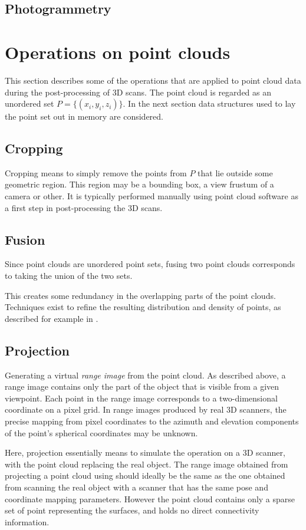 \subsection{Photogrammetry}


\section{Operations on point clouds}
This section describes some of the operations that are applied to point cloud data during the post-processing of 3D scans. The point cloud is regarded as an unordered set $P = \{ (x_i, y_i, z_i) \}$. In the next section data structures used to lay the point set out in memory are considered.


\subsection{Cropping}
Cropping means to simply remove the points from $P$ that lie outside some geometric region. This region may be a bounding box, a view frustum of a camera or other. It is typically performed manually using point cloud software as a first step in post-processing the 3D scans.

\subsection{Fusion}
Since point clouds are unordered point sets, fusing two point clouds corresponds to taking the union of the two sets.

This creates some redundancy in the overlapping parts of the point clouds. Techniques exist to refine the resulting distribution and density of points, as described for example in \cite{Kyos2013}.


\subsection{Projection}
Generating a virtual \emph{range image} from the point cloud. As described above, a range image contains only the part of the object that is visible from a given viewpoint. Each point in the range image corresponds to a two-dimensional coordinate on a pixel grid. In range images produced by real 3D scanners, the precise mapping from pixel coordinates to the azimuth and elevation components of the point's spherical coordinates may be unknown.

Here, projection essentially means to simulate the operation on a 3D scanner, with the point cloud replacing the real object. The range image obtained from projecting a point cloud using should ideally be the same as the one obtained from scanning the real object with a scanner that has the same pose and coordinate mapping parameters. However the point cloud contains only a sparse set of point representing the surfaces, and holds no direct connectivity information.

